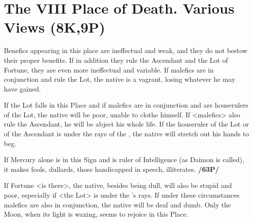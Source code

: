 \section{The VIII Place of Death. Various Views (8K,9P)}

Benefics appearing in this place are ineffectual and weak, and they do not bestow their proper benefits. If in addition they rule the Ascendant and the Lot of Fortune, they are even more ineffectual and variable. If malefics are in conjunction and rule the Lot, the native is a vagrant, losing whatever he may have gained.

If the Lot falls in this Place and if malefics are in conjunction and are houserulers of the Lot, the native will be poor, unable to clothe himself. If <malefics> also rule the Ascendant, he will be abject his whole life. If the houseruler of the Lot or of the Ascendant is under the rays of the \Sun, the native will stretch out his hands to beg. 

If Mercury alone is in this Sign and is ruler of Intelligence (as Daimon is called), it makes fools, dullards, those handicapped in speech, illiterates. \textbf{/63P/}

If Fortune <is there>, the native, besides being dull, will also be stupid and poor, especially if <the Lot> is under the \Sun's rays. If under these circumstances malefics are also in conjunction, the native will be deaf and dumb. Only the Moon, when its light is waxing, seems to rejoice in this Place.

\newpage
